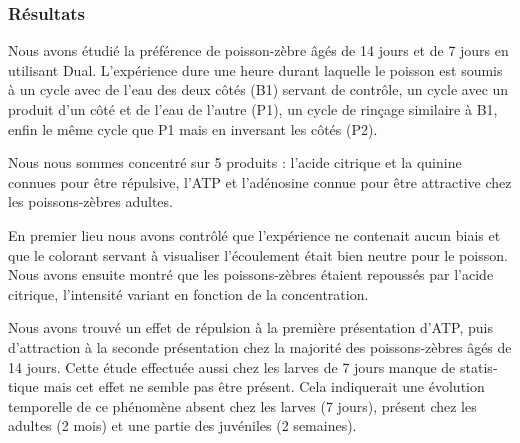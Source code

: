 \begin{otherlanguage}{french}
\subsubsection*{Résultats}
Nous avons étudié la préférence de poisson-zèbre âgés de 14 jours et de 7 jours en utilisant Dual. L'expérience dure une heure durant laquelle le poisson est soumis à un cycle avec de l'eau des deux côtés (B1) servant de contrôle, un cycle avec un produit d'un côté et de l'eau de l'autre (P1), un cycle de rinçage similaire à B1, enfin le même cycle que P1 mais en inversant les côtés (P2).

Nous nous sommes concentré sur 5 produits : l'acide citrique et la quinine connues pour être répulsive, l'ATP et l'adénosine connue pour être attractive chez les poissons-zèbres adultes.

En premier lieu nous avons contrôlé que l'expérience ne contenait aucun biais et que le colorant servant à visualiser l'écoulement était bien neutre pour le poisson. Nous avons ensuite montré que les poissons-zèbres étaient repoussés par l'acide citrique, l'intensité variant en fonction de la concentration.

Nous avons trouvé un effet de répulsion à la première présentation d'ATP, puis d'attraction à la seconde présentation chez la majorité des poissons-zèbres âgés de 14 jours. Cette étude effectuée aussi chez les larves de 7 jours manque de statistique mais cet effet ne semble pas être présent. Cela indiquerait une évolution temporelle de ce phénomène absent chez les larves (7 jours), présent chez les adultes (2 mois) et une partie des juvéniles (2 semaines).
\end{otherlanguage}
